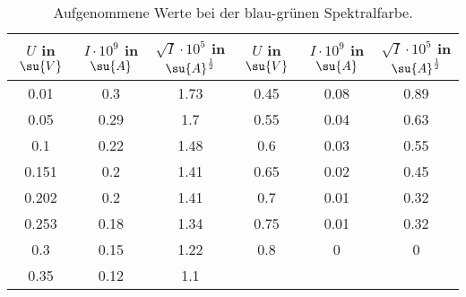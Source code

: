 \begin{table}
  \centering
  \label{tab:blaugruen}
  \caption{Aufgenommene Werte bei der blau-grünen Spektralfarbe.}
  \begin{tabular}{c c c | c c c}
    \toprule
    $U$ in $\su{V}$ & $I\cdot 10^{9}$ in $\su{A}$ & $\sqrt{I}\cdot10^{5}$ in $\su{A}^{\frac{1}{2}}$ &
    $U$ in $\su{V}$ & $I\cdot 10^{9}$ in $\su{A}$ & $\sqrt{I}\cdot10^{5}$ in $\su{A}^{\frac{1}{2}}$ \\
    \midrule
    0.01  & 0.3  & 1.73 & 0.45  & 0.08 & 0.89 \\
    0.05  & 0.29 & 1.7  & 0.55  & 0.04 & 0.63 \\
    0.1   & 0.22 & 1.48 & 0.6   & 0.03 & 0.55 \\
    0.151 & 0.2  & 1.41 & 0.65  & 0.02 & 0.45 \\
    0.202 & 0.2  & 1.41 & 0.7   & 0.01 & 0.32 \\
    0.253 & 0.18 & 1.34 & 0.75  & 0.01 & 0.32 \\
    0.3   & 0.15 & 1.22 & 0.8   & 0    & 0    \\
    0.35  & 0.12 & 1.1  &       &      &      \\
    \bottomrule
  \end{tabular}
\end{table}

